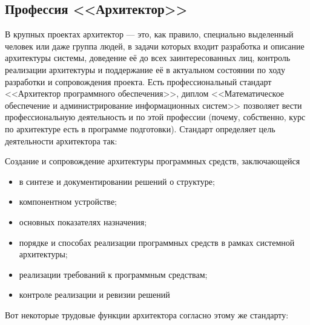 \documentclass[a5paper]{article}
\begin{document}
\subsection{Профессия <<Архитектор>>}

В крупных проектах архитектор --- это, как правило, специально выделенный человек или даже группа людей, в задачи которых входит разработка и описание архитектуры системы, доведение её до всех заинтересованных лиц, контроль реализации архитектуры и поддержание её в актуальном состоянии по ходу разработки и сопровождения проекта. Есть профессиональный стандарт <<Архитектор программного обеспечения>>, диплом <<Математическое обеспечение и администрирование информационных систем>> позволяет вести профессиональную деятельность и по этой профессии (почему, собственно, курс по архитектуре есть в программе подготовки). Стандарт определяет цель деятельности архитектора так:

{\ttfamily
Создание и сопровождение архитектуры программных средств, заключающейся 
	\begin{itemize}
		\item в синтезе и документировании решений о структуре;
		\item компонентном устройстве;
		\item основных показателях назначения; 
		\item порядке и способах реализации программных средств в рамках системной архитектуры; 
		\item реализации требований к программным средствам; 
		\item контроле реализации и ревизии решений
	\end{itemize}
}

Вот некоторые трудовые функции архитектора согласно этому же стандарту:
\end{document}
